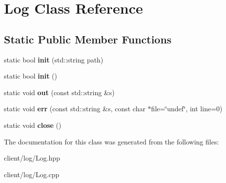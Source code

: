 \hypertarget{class_log}{\section{Log Class Reference}
\label{class_log}
}
\subsection*{Static Public Member Functions}
\begin{DoxyCompactItemize}
\item 
\hypertarget{class_log_ad2ad305c7a5568d4ff89df63b7df023b}{static bool {\bfseries init} (std\-::string path)}\label{class_log_ad2ad305c7a5568d4ff89df63b7df023b}

\item 
\hypertarget{class_log_add642ef2c66a1773737afedb7531fbc3}{static bool {\bfseries init} ()}\label{class_log_add642ef2c66a1773737afedb7531fbc3}

\item 
\hypertarget{class_log_a81fa7aade11d8cd8bf1e8d9bac33f92a}{static void {\bfseries out} (const std\-::string \&s)}\label{class_log_a81fa7aade11d8cd8bf1e8d9bac33f92a}

\item 
\hypertarget{class_log_a30b6e5da5382d09ad9c8e906893cfafa}{static void {\bfseries err} (const std\-::string \&s, const char $\ast$file=\char`\"{}undef\char`\"{}, int line=0)}\label{class_log_a30b6e5da5382d09ad9c8e906893cfafa}

\item 
\hypertarget{class_log_adcbc96155698ce75c3ff098cb7699c09}{static void {\bfseries close} ()}\label{class_log_adcbc96155698ce75c3ff098cb7699c09}

\end{DoxyCompactItemize}


The documentation for this class was generated from the following files\-:\begin{DoxyCompactItemize}
\item 
client/log/Log.\-hpp\item 
client/log/Log.\-cpp\end{DoxyCompactItemize}
